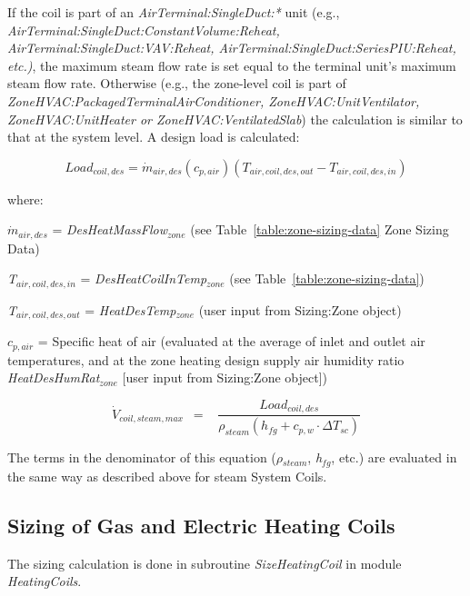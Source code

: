 If the coil is part of an \emph{AirTerminal:SingleDuct:*} unit (e.g., \emph{Air\-Terminal:\-Single\-Duct:\-Constant\-Volume\-:Re\-heat, Air\-Terminal:\-Single\-Duct:\-VAV:\-Re\-heat, Air\-Terminal:\-Single\-Duct:\-Series\-PIU:\-Re\-heat, etc.)}, the maximum steam flow rate is set equal to the terminal unit's maximum steam flow rate. Otherwise (e.g., the zone-level coil is part of \emph{Zone\-HVAC:\-Packaged\-Terminal\-Air\-Conditioner, Zone\-HVAC\-:Unit\-Ventilator, Zone\-HVAC\-:Unit\-Heater or Zone\-HVAC:\-Ventilated\-Slab}) the calculation is similar to that at the system level. A design load is calculated:

\begin{equation}
Loa{d_{coil,des}} = {\dot m_{air,des}}({c_{p,air}})({T_{air,coil,des,out}} - {T_{air,coil,des,in}})
\end{equation}

where:

\({\dot m_{air,des}}\) = \emph{DesHeatMassFlow\(_{zone}\)} (see Table~\ref{table:zone-sizing-data} Zone Sizing Data)

\emph{T\(_{air,coil,des,in}\)} = \emph{DesHeatCoilInTemp\(_{zone}\)} (see Table~\ref{table:zone-sizing-data})

\emph{T\(_{air,coil,des,out}\)} = \emph{HeatDesTemp\(_{zone}\)} (user input from Sizing:Zone object)

\({c_{p,air}}\) = Specific heat of air (evaluated at the average of inlet and outlet air temperatures, and at the zone heating design supply air humidity ratio \emph{HeatDesHumRat\(_{zone}\)} {[}user input from Sizing:Zone object{]})

\begin{equation}
{\dot V_{coil,steam,max}}\,\,\, = \,\,\,\,\,\frac{{Loa{d_{coil,des}}}}{{{\rho_{steam}}\left( {{h_{fg}} + {c_{p,w}}\cdot \Delta {T_{sc}}} \right)}}
\end{equation}

The terms in the denominator of this equation (\emph{\(\rho\)\(_{steam}\)}, \emph{h\(_{fg}\)}, etc.) are evaluated in the same way as described above for steam System Coils.

\subsection{Sizing of Gas and Electric Heating Coils}\label{sizing-of-gas-and-electric-heating-coils}

The sizing calculation is done in subroutine \emph{SizeHeatingCoil} in module \emph{HeatingCoils}.


